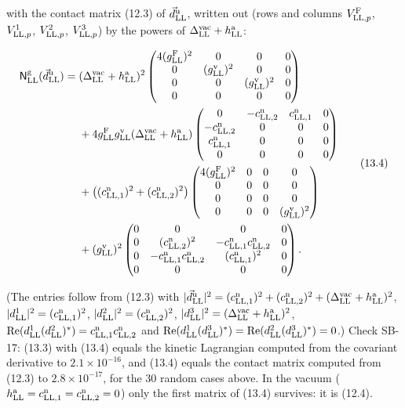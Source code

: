 \documentclass[
  10pt,
]{article}
\begin{document}
with the contact matrix (12.3) of \(\vec d^{\rm u}_{\rm LL}\), written
out (rows and columns \(V^{\rm F}_{{\rm LL},p}\), \(V^1_{{\rm LL},p}\),
\(V^2_{{\rm LL},p}\), \(V^3_{{\rm LL},p}\)) by the powers of
\(\Delta^{\rm vac}_{\rm LL}+h^{\rm a}_{\rm LL}\):

\[\begin{aligned}\mathsf N^{\rm g}_{\rm LL}(\vec d^{\rm u}_{\rm LL})={}&(\Delta^{\rm vac}_{\rm LL}+h^{\rm a}_{\rm LL})^2\begin{pmatrix}4(g^{\rm F}_{\rm LL})^2&0&0&0\\0&(g^{\rm v}_{\rm LL})^2&0&0\\0&0&(g^{\rm v}_{\rm LL})^2&0\\0&0&0&0\end{pmatrix}\\&+4g^{\rm F}_{\rm LL}g^{\rm v}_{\rm LL}(\Delta^{\rm vac}_{\rm LL}+h^{\rm a}_{\rm LL})\begin{pmatrix}0&-c^{\rm n}_{{\rm LL},2}&c^{\rm n}_{{\rm LL},1}&0\\-c^{\rm n}_{{\rm LL},2}&0&0&0\\c^{\rm n}_{{\rm LL},1}&0&0&0\\0&0&0&0\end{pmatrix}\\&+\big((c^{\rm n}_{{\rm LL},1})^2+(c^{\rm n}_{{\rm LL},2})^2\big)\begin{pmatrix}4(g^{\rm F}_{\rm LL})^2&0&0&0\\0&0&0&0\\0&0&0&0\\0&0&0&(g^{\rm v}_{\rm LL})^2\end{pmatrix}\\&+(g^{\rm v}_{\rm LL})^2\begin{pmatrix}0&0&0&0\\0&(c^{\rm n}_{{\rm LL},2})^2&-c^{\rm n}_{{\rm LL},1}c^{\rm n}_{{\rm LL},2}&0\\0&-c^{\rm n}_{{\rm LL},1}c^{\rm n}_{{\rm LL},2}&(c^{\rm n}_{{\rm LL},1})^2&0\\0&0&0&0\end{pmatrix}.\end{aligned}\tag{13.4}\]

(The entries follow from (12.3) with
\(\lvert\vec d^{\rm u}_{\rm LL}\rvert^2=(c^{\rm n}_{{\rm LL},1})^2+(c^{\rm n}_{{\rm LL},2})^2+(\Delta^{\rm vac}_{\rm LL}+h^{\rm a}_{\rm LL})^2\),
\(\lvert d^1_{\rm LL}\rvert^2=(c^{\rm n}_{{\rm LL},1})^2\),
\(\lvert d^2_{\rm LL}\rvert^2=(c^{\rm n}_{{\rm LL},2})^2\),
\(\lvert d^3_{\rm LL}\rvert^2=(\Delta^{\rm vac}_{\rm LL}+h^{\rm a}_{\rm LL})^2\),
\({\rm Re}(d^1_{\rm LL}(d^2_{\rm LL})^*)=c^{\rm n}_{{\rm LL},1}c^{\rm n}_{{\rm LL},2}\)
and
\({\rm Re}(d^1_{\rm LL}(d^3_{\rm LL})^*)={\rm Re}(d^2_{\rm LL}(d^3_{\rm LL})^*)=0\).)
Check SB-17: (13.3) with (13.4) equals the kinetic Lagrangian computed
from the covariant derivative to \(2.1\times10^{-16}\), and (13.4)
equals the contact matrix computed from (12.3) to \(2.8\times10^{-17}\),
for the 30 random cases above. In the vacuum
(\(h^{\rm a}_{\rm LL}=c^{\rm n}_{{\rm LL},1}=c^{\rm n}_{{\rm LL},2}=0\))
only the first matrix of (13.4) survives: it is (12.4).
\end{document}
